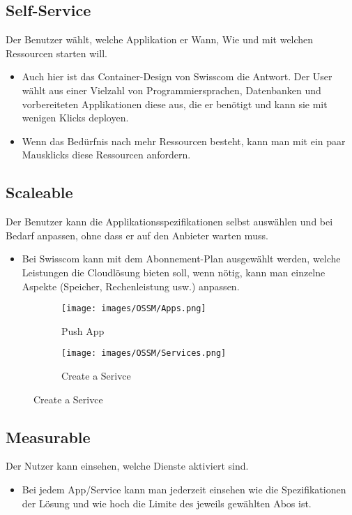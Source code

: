 \documentclass[11pt,titlepage]{article}
\begin{document}
\subsection{Self-Service}
Der Benutzer wählt, welche Applikation er Wann, Wie und mit welchen Ressourcen starten will.
\begin{itemize}
	\item Auch hier ist das Container-Design von Swisscom die Antwort. Der User wählt aus einer Vielzahl von Programmiersprachen, Datenbanken und vorbereiteten Applikationen diese aus, die er benötigt und kann sie mit wenigen Klicks deployen.
	\item Wenn das Bedürfnis nach mehr Ressourcen besteht, kann man mit ein paar Mausklicks diese Ressourcen anfordern.
\end{itemize}
\subsection{Scaleable}
Der Benutzer kann die Applikationsspezifikationen selbst auswählen und bei Bedarf anpassen, ohne dass er auf den Anbieter warten muss.
\begin{itemize}
	\item Bei Swisscom kann mit dem Abonnement-Plan ausgewählt werden, welche Leistungen die Cloudlösung bieten soll, wenn nötig, kann man einzelne Aspekte (Speicher, Rechenleistung usw.) anpassen.
\end{itemize}
\begin{figure}[H]
	\caption{Create Apps and Services}
	\begin{subfigure}{0.48\textwidth}
		\texttt{[image: images/OSSM/Apps.png]} 
		\caption{Push App}
		\label{fig:pushApp}
	\end{subfigure}
	\begin{subfigure}{0.48\textwidth}
		\texttt{[image: images/OSSM/Services.png]}
		\caption{Create a Serivce}
		\label{fig:createService}
	\end{subfigure}
\end{figure}
\subsection{Measurable}
Der Nutzer kann einsehen, welche Dienste aktiviert sind.
\begin{itemize}
	\item Bei jedem App/Service kann man jederzeit einsehen wie die Spezifikationen der Lösung und wie hoch die Limite des jeweils gewählten Abos ist.
\end{itemize}
\end{document}
